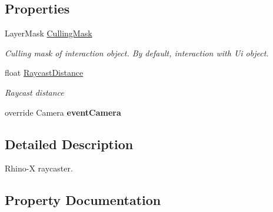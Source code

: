 \subsection*{Properties}
\begin{DoxyCompactItemize}
\item 
Layer\+Mask \mbox{\hyperlink{class_ximmerse_1_1_rhino_x_1_1_r_x_raycaster_a86b39123e4c2487a2906369278e075f8}{Culling\+Mask}}
\begin{DoxyCompactList}\small\item\em Culling mask of interaction object. By default, interaction with Ui object. \end{DoxyCompactList}\item 
float \mbox{\hyperlink{class_ximmerse_1_1_rhino_x_1_1_r_x_raycaster_a122146e73455860e6aaf030211fe948c}{Raycast\+Distance}}
\begin{DoxyCompactList}\small\item\em Raycast distance \end{DoxyCompactList}\item 
\mbox{\label{class_ximmerse_1_1_rhino_x_1_1_r_x_raycaster_a86af80ce816c32ad5fb680c6a67716a1}} 
override Camera {\bfseries event\+Camera}
\end{DoxyCompactItemize}


\subsection{Detailed Description}
Rhino-\/X raycaster. 



\subsection{Property Documentation}
\mbox{\label{class_ximmerse_1_1_rhino_x_1_1_r_x_raycaster_a86b39123e4c2487a2906369278e075f8}} 
